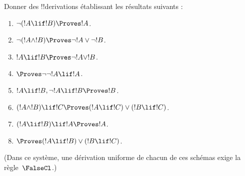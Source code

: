 \documentclass[../../../include/open-logic-section]{subfiles}
\begin{document}
\begin{prob}
Donner des !!{derivation}s établissant les résultats suivants :
\begin{enumerate}
\item $\lnot(!A \lif !B) \Proves !A$.
\item $\lnot(!A \land !B) \Proves \lnot !A \lor \lnot !B$.
\item $!A \lif !B \Proves \lnot !A \lor !B$.
\item $\Proves \lnot \lnot !A \lif !A$.
\item $!A \lif !B, \lnot !A \lif !B \Proves !B$.
\item $(!A \land !B) \lif !C \Proves (!A \lif !C) \lor (!B \lif !C)$.
\item $(!A \lif !B) \lif !A \Proves !A$.
\item $\Proves (!A \lif !B) \lor (!B \lif !C)$.
\end{enumerate}
(Dans ce système, une dérivation uniforme de chacun de ces
schémas exige la règle~$\FalseCl$.)
\end{prob}
%
%
%
%
%
%
%
%
%
%
%
\end{document}
